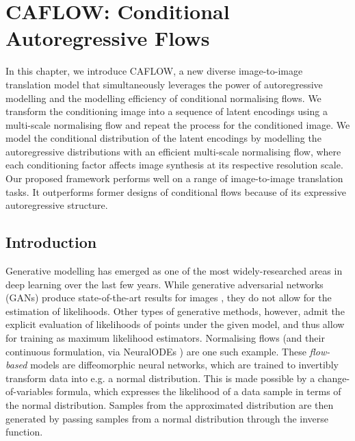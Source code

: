 
\chapter{CAFLOW: Conditional Autoregressive Flows} \label{Chapter:CAFLOW}  %

\ifpdf
    \graphicspath{{Chapter1/Figs/Raster/}{Chapter1/Figs/PDF/}{Chapter1/Figs/}}
\else
    \graphicspath{{Chapter1/Figs/Vector/}{Chapter1/Figs/}}
\fi

In this chapter, we introduce CAFLOW, a new diverse image-to-image translation model that simultaneously leverages the power of autoregressive modelling and the modelling efficiency of conditional normalising flows. We transform the conditioning image into a sequence of latent encodings using a multi-scale normalising flow and repeat the process for the conditioned image. We model the conditional distribution of the latent encodings by modelling the autoregressive distributions with an efficient multi-scale normalising flow, where each conditioning factor affects image synthesis at its respective resolution scale. Our proposed framework performs well on a range of image-to-image translation tasks. It outperforms former designs of conditional flows because of its expressive autoregressive structure.

\section{Introduction}

Generative modelling has emerged as one of the most widely-researched areas in deep learning over the last few years. While generative adversarial networks (GANs) \cite{GANs} produce state-of-the-art results for images \cite{viazovetskyi2020stylegan2}, they do not allow for the estimation of likelihoods. Other types of generative methods, however, admit the explicit evaluation of likelihoods of points under the given model, and thus allow for training as maximum likelihood estimators. Normalising flows \cite{rezende2015variational} (and their continuous formulation, via NeuralODEs \cite{neuralODEs}) are one such example. These \emph{flow-based} models are diffeomorphic neural networks, which are trained to invertibly transform data into e.g. a normal distribution. This is made possible by a change-of-variables formula, which expresses the likelihood of a data sample in terms of the normal distribution. Samples from the approximated distribution are then generated by passing samples from a normal distribution through the inverse function.

